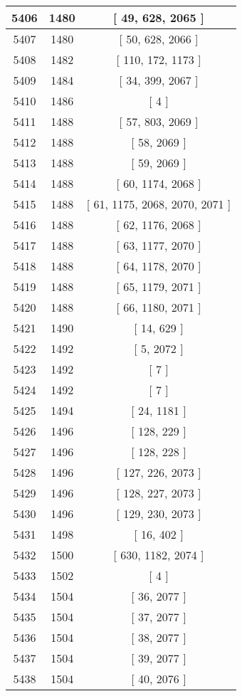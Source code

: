 \begin{center}
\begin{longtable}[H]{|| c c c ||}
\hline
5406 & 1480 & [ 49, 628, 2065 ] \\ 
\hline
5407 & 1480 & [ 50, 628, 2066 ] \\ 
\hline
5408 & 1482 & [ 110, 172, 1173 ] \\ 
\hline
5409 & 1484 & [ 34, 399, 2067 ] \\ 
\hline
5410 & 1486 & [ 4 ] \\ 
\hline
5411 & 1488 & [ 57, 803, 2069 ] \\ 
\hline
5412 & 1488 & [ 58, 2069 ] \\ 
\hline
5413 & 1488 & [ 59, 2069 ] \\ 
\hline
5414 & 1488 & [ 60, 1174, 2068 ] \\ 
\hline
5415 & 1488 & [ 61, 1175, 2068, 2070, 2071 ] \\ 
\hline
5416 & 1488 & [ 62, 1176, 2068 ] \\ 
\hline
5417 & 1488 & [ 63, 1177, 2070 ] \\ 
\hline
5418 & 1488 & [ 64, 1178, 2070 ] \\ 
\hline
5419 & 1488 & [ 65, 1179, 2071 ] \\ 
\hline
5420 & 1488 & [ 66, 1180, 2071 ] \\ 
\hline
5421 & 1490 & [ 14, 629 ] \\ 
\hline
5422 & 1492 & [ 5, 2072 ] \\ 
\hline
5423 & 1492 & [ 7 ] \\ 
\hline
5424 & 1492 & [ 7 ] \\ 
\hline
5425 & 1494 & [ 24, 1181 ] \\ 
\hline
5426 & 1496 & [ 128, 229 ] \\ 
\hline
5427 & 1496 & [ 128, 228 ] \\ 
\hline
5428 & 1496 & [ 127, 226, 2073 ] \\ 
\hline
5429 & 1496 & [ 128, 227, 2073 ] \\ 
\hline
5430 & 1496 & [ 129, 230, 2073 ] \\ 
\hline
5431 & 1498 & [ 16, 402 ] \\ 
\hline
5432 & 1500 & [ 630, 1182, 2074 ] \\ 
\hline
5433 & 1502 & [ 4 ] \\ 
\hline
5434 & 1504 & [ 36, 2077 ] \\ 
\hline
5435 & 1504 & [ 37, 2077 ] \\ 
\hline
5436 & 1504 & [ 38, 2077 ] \\ 
\hline
5437 & 1504 & [ 39, 2077 ] \\ 
\hline
5438 & 1504 & [ 40, 2076 ] \\ 

\end{longtable}
\end{center}
